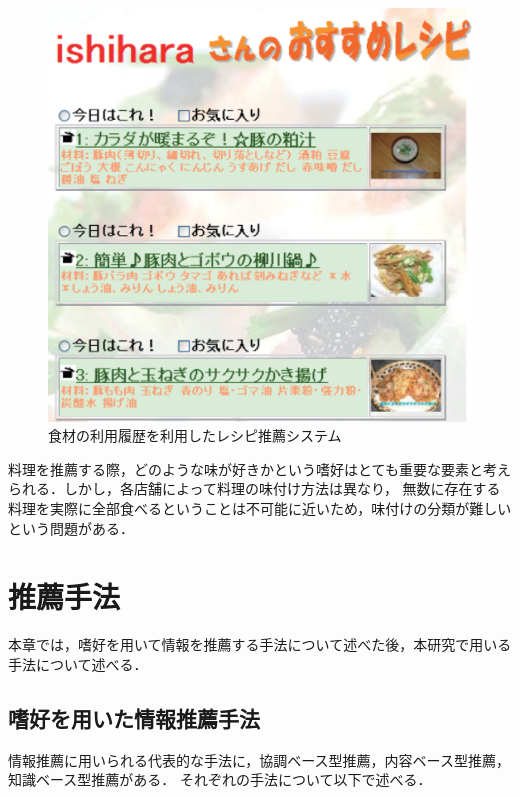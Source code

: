 \documentclass{funthesis}
\begin{document}
\begin{figure}[!b]
  \begin{center}
    \includegraphics[clip,width=13cm]{resipi.eps}
    \caption[食材の利用履歴を利用したレシピ推薦システム]{食材の利用履歴を利用したレシピ推薦システム\cite{8}}
  \end{center}
\end{figure}

料理を推薦する際，どのような味が好きかという嗜好はとても重要な要素と考えられる．しかし，各店舗によって料理の味付け方法は異なり，
無数に存在する料理を実際に全部食べるということは不可能に近いため，味付けの分類が難しいという問題がある．


\chapter{推薦手法}
本章では，嗜好を用いて情報を推薦する手法について述べた後，本研究で用いる手法について述べる．

\section{嗜好を用いた情報推薦手法}
情報推薦に用いられる代表的な手法に，協調ベース型推薦，内容ベース型推薦，知識ベース型推薦がある\cite{9}．
それぞれの手法について以下で述べる．
\end{document}

